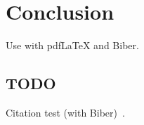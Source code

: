 
\chapter{Conclusion}\label{chapter:conclusion}
Use with pdfLaTeX and Biber.

\section{TODO}
Citation test (with Biber)~\parencite{latex}.